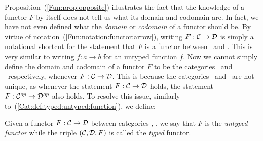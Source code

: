 Proposition~(\ref{Fun:prop:opposite}) illustrates the fact that the knowledge
of a functor $F$ by itself does not tell us what its domain and codomain are.
In fact, we have not even defined what the {\em domain} or {\em codomain} of 
a functor should be. By virtue of notation~(\ref{Fun:notation:functor:arrow}), 
writing $F:\mbox{$\cal C$}\to\mbox{$\cal D$}$ is simply a notational shortcut for the statement that 
$F$ is a functor between \Cat\ and \Dat. This is very similar to writing
$f:a \to b$ for an untyped function $f$. Now we cannot simply define 
the domain and codomain of a functor $F$ to be the categories \Cat\ and
\Dat\ respectively, whenever $F:\mbox{$\cal C$}\to\mbox{$\cal D$}$. This is because the categories
\Cat\ and \Dat\ are not unique, as whenever the statement $F:\mbox{$\cal C$}\to\mbox{$\cal D$}$
holds, the statement $F:\mbox{${\cal C}^{op}$}\to\mbox{${\cal D}^{op}$}$ also holds. To resolve this issue,
similarly to~(\ref{Cat:def:typed:untyped:function}), we define:

\begin{defin}\label{Fun:def:typed:untyped:functor}
    Given a functor $F:\mbox{$\cal C$}\to\mbox{$\cal D$}$ between categories \Cat, \Dat,
    we say that $F$ is the {\em untyped functor} while the triple 
    $(\mbox{$\cal C$},\mbox{$\cal D$},F)$ is called the {\em typed} functor.
\end{defin}
